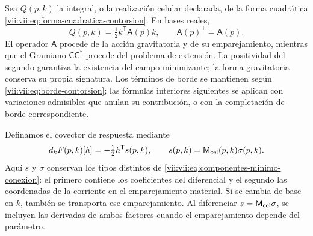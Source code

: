 Sea \(Q(p,k)\) la integral, o la realización celular declarada, de
la forma cuadrática
\eqref{vii:vii:eq:forma-cuadratica-contorsion}. En bases reales,
\begin{equation}
 Q(p,k)=\tfrac12 k^{\mathsf T}\mathsf A(p)k,
 \qquad \mathsf A(p)^{\mathsf T}=\mathsf A(p).
 \label{vii:vii:eq:cuadratica-celular-contorsion}
\end{equation}
El operador \(\mathsf A\) procede de la acción gravitatoria y de
su emparejamiento, mientras que el Gramiano
\(\mathsf C\mathsf C^*\) procede del problema de extensión.
La positividad del segundo garantiza la existencia del campo
minimizante; la forma gravitatoria conserva su propia signatura.
Los términos de borde se mantienen según
\eqref{vii:vii:eq:borde-contorsion}; las fórmulas interiores siguientes
se aplican con variaciones admisibles que anulan su contribución, o
con la completación de borde correspondiente.

Definamos el covector de respuesta mediante
\begin{equation}
 d_kF(p,k)[h]= -\tfrac12 h^{\mathsf T}s(p,k),
 \qquad s(p,k)=\mathsf M_{\rm cel}(p,k)\sigma(p,k).
 \label{vii:vii:eq:covector-torsional-minimo}
\end{equation}
Aquí \(s\) y \(\sigma\) conservan los tipos distintos de
\eqref{vii:vii:eq:componentes-minimo-conexion}: el primero contiene los
coeficientes del diferencial y el segundo las coordenadas de la
corriente en el emparejamiento material. Si se cambia de base en
\(k\), también se transporta ese emparejamiento. Al diferenciar
\(s=\mathsf M_{\rm cel}\sigma\), se incluyen las derivadas de
ambos factores cuando el emparejamiento depende del parámetro.

